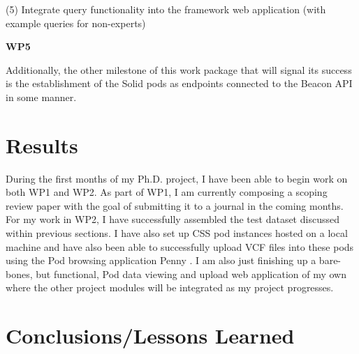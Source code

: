 \documentclass[runningheads]{llncs}
\begin{document}
(5) Integrate query functionality into the framework web application (with example queries for non-experts)

\textbf{WP5}

Additionally, the other milestone of this work package that will signal its success is the establishment of the Solid pods as endpoints connected to the Beacon API in some manner. 


\section{Results}

During the first months of my Ph.D. project, I have been able to begin work on both WP1 and WP2. 
As part of WP1, I am currently composing a scoping review paper with the goal of submitting it to a journal in the coming months.
For my work in WP2, I have successfully assembled the test dataset discussed within previous sections.
I have also set up CSS pod instances hosted on a local machine and have also been able to successfully upload VCF files into these pods using the Pod browsing application Penny \cite{penny}. 
I am also just finishing up a bare-bones, but functional, Pod data viewing and upload web application of my own where the other project modules will be integrated as my project progresses.


\section{Conclusions/Lessons Learned}

\end{document}
